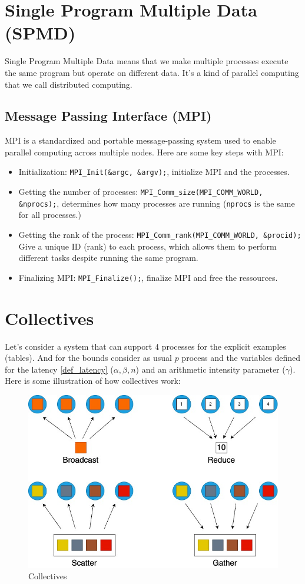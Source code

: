 \documentclass[12pt, openany]{report}
\theoremstyle{definition}
\newcommand{\code}[1]{\colorbox{light-gray}{\texttt{#1}}}
\begin{document}
\section{Single Program Multiple Data (SPMD)}
Single Program Multiple Data means that we make multiple processes execute the same program but operate on different data. It's a kind of parallel computing that we call distributed computing.
\subsection{Message Passing Interface (MPI)}
MPI is a standardized and portable message-passing system used to enable parallel computing across multiple nodes.
Here are some key steps with MPI:
\begin{itemize}
	\item Initialization: \code{MPI\_Init(\&argc, \&argv);}, initialize MPI and the processes.
	\item Getting the number of processes: \code{MPI\_Comm\_size(MPI\_COMM\_WORLD, \&nprocs);}, determines how many processes are running (\code{nprocs} is the same for all processes.)
	\item Getting the rank of the process: \code{MPI\_Comm\_rank(MPI\_COMM\_WORLD, \&procid);} Give a unique ID (rank) to each process, which allows them to perform different tasks despite running the same program.
	\item Finalizing MPI:  \code{MPI\_Finalize();}, finalize MPI and free the ressources.
\end{itemize}
\newpage
\section{Collectives}
Let's consider a system that can support $4$ processes for the explicit examples (tables). And for the bounds consider as usual $p$ process and the variables defined for the latency \ref{def_latency} ($\alpha,\beta,n$) and an arithmetic intensity parameter ($\gamma$). Here is some illustration of how collectives work:
\begin{figure}[H]
	\centering
	\includegraphics[scale=0.5]{img/collectives.jpeg}
	\caption{Collectives}
	\label{fig:collectives}
\end{figure}
\end{document}
